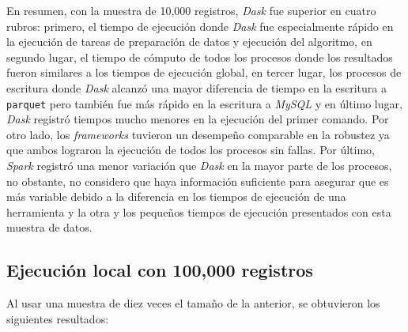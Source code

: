 En resumen, con la muestra de 10,000 registros, \textit{Dask} fue superior en cuatro rubros: primero, el tiempo de ejecución donde \textit{Dask} fue especialmente rápido en la ejecución de tareas de preparación de datos y ejecución del algoritmo, en segundo lugar, el tiempo de cómputo de todos los procesos donde los resultados fueron similares a los tiempos de ejecución global, en tercer lugar, los procesos de escritura donde \textit{Dask} alcanzó una mayor diferencia de tiempo en la escritura a \texttt{parquet} pero también fue más rápido en la escritura a \textit{MySQL} y en último lugar, \textit{Dask} registró tiempos mucho menores en la ejecución del primer comando. Por otro lado, los \textit{frameworks} tuvieron un desempeño comparable en la robustez ya que ambos lograron la ejecución de todos los procesos sin fallas. Por último, \textit{Spark} registró una menor variación que \textit{Dask} en la mayor parte de los procesos, no obstante, no considero que haya información suficiente para asegurar que es más variable debido a la diferencia en los tiempos de ejecución de una herramienta y la otra y los pequeños tiempos de ejecución presentados con esta muestra de datos.


\subsection{Ejecución local con 100,000 registros}

Al usar una muestra de diez veces el tamaño de la anterior, se obtuvieron los siguientes resultados:


